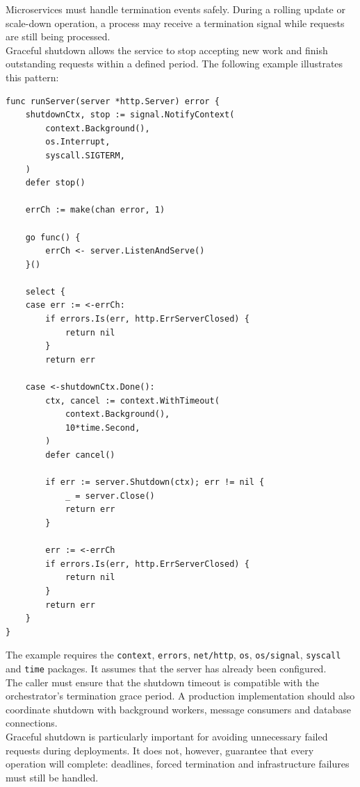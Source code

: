 Microservices must handle termination events safely. During a rolling update or scale-down operation, a process may receive a termination signal while requests are still being processed.\\

Graceful shutdown allows the service to stop accepting new work and finish outstanding requests within a defined period. The following example illustrates this pattern:

\begin{lstlisting}
func runServer(server *http.Server) error {
    shutdownCtx, stop := signal.NotifyContext(
        context.Background(),
        os.Interrupt,
        syscall.SIGTERM,
    )
    defer stop()

    errCh := make(chan error, 1)

    go func() {
        errCh <- server.ListenAndServe()
    }()

    select {
    case err := <-errCh:
        if errors.Is(err, http.ErrServerClosed) {
            return nil
        }
        return err

    case <-shutdownCtx.Done():
        ctx, cancel := context.WithTimeout(
            context.Background(),
            10*time.Second,
        )
        defer cancel()

        if err := server.Shutdown(ctx); err != nil {
            _ = server.Close()
            return err
        }

        err := <-errCh
        if errors.Is(err, http.ErrServerClosed) {
            return nil
        }
        return err
    }
}
\end{lstlisting}

The example requires the \texttt{context}, \texttt{errors}, \texttt{net/http}, \texttt{os}, \texttt{os/signal}, \texttt{syscall} and \texttt{time} packages. It assumes that the server has already been configured.\\

The caller must ensure that the shutdown timeout is compatible with the orchestrator's termination grace period. A production implementation should also coordinate shutdown with background workers, message consumers and database connections.\\

Graceful shutdown is particularly important for avoiding unnecessary failed requests during deployments. It does not, however, guarantee that every operation will complete: deadlines, forced termination and infrastructure failures must still be handled.

